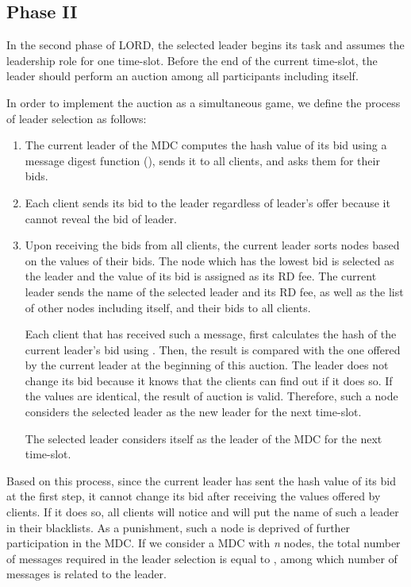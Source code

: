 \documentclass[journal,12pt, onecolumn]{IEEEtran}
\begin{document}
\subsection{Phase II}\label{section:phase2}
In the second phase of LORD, the selected leader begins its task and assumes the leadership role for one time-slot. Before the end of the current time-slot, the leader should perform an auction among all participants including itself.




In order to implement the auction as a simultaneous game, we define the process of leader selection as follows:

\begin{enumerate}
\item The current leader of the MDC computes the hash value of its bid using a message digest function (), sends it to all clients, and asks them for their bids.
\item Each client sends its bid to the leader regardless of leader's offer because it cannot reveal the bid of leader.
\item Upon receiving the bids from all clients, the current leader sorts nodes based on the values of their bids. The node which has the lowest bid is selected as the leader and the value of its bid is assigned as its RD fee. The current leader sends the name of the selected leader and its RD fee, as well as the list of other nodes including itself, and their bids to all clients. 

Each client that has received such a message, first calculates the hash of the current leader's bid using . Then, the result is compared with the one offered by the current leader at the beginning of this auction. The leader does not change its bid because it knows that the clients can find out if it does so.
If the values are identical, the result of auction is valid. Therefore, such a node considers the selected leader as the new leader for the next time-slot.

The selected leader considers itself as the leader of the MDC for the next time-slot.
\end{enumerate}

Based on this process, since the current leader has sent the hash value of its bid at the first step, it cannot change its bid after receiving the values offered by clients. If it does so, all clients will notice and will put the name of such a leader in their blacklists. As a punishment, such a node is deprived of further participation in the MDC. If we consider a MDC with \textit{n} nodes, the total number of messages required in the leader selection is equal to , among which  number of messages is related to the leader. 
\end{document}
